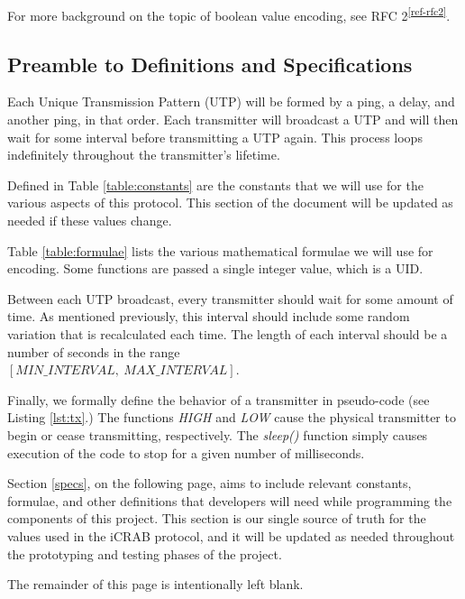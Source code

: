 \documentclass[12pt,hidelinks]{article}
\newcommand{\fastcite}[1]{\textsuperscript{\ref{#1}}}
\begin{document}
For more background on the topic of boolean value encoding, see
RFC 2\fastcite{ref-rfc2}.

\subsection{Preamble to Definitions and Specifications} \label{preamble}

Each Unique Transmission Pattern (UTP) will be formed by a ping, a delay,
and another ping, in that order.
Each transmitter will broadcast a UTP and will then wait for some interval
before transmitting a UTP again.
This process loops indefinitely throughout the transmitter's lifetime.

Defined in Table \ref{table:constants} are the constants that we will use for
the various aspects of this protocol.
This section of the document will be updated as needed if these values
change.

Table \ref{table:formulae} lists the various mathematical formulae we will
use for encoding.
Some functions are passed a single integer value, which is a UID.

Between each UTP broadcast, every transmitter should wait for some amount
of time.
As mentioned previously, this interval should include some random variation
that is recalculated each time.
The length of each interval should be a number of seconds in the range\\
$[MIN\_INTERVAL,\ MAX\_INTERVAL]$.

Finally, we formally define the behavior of a transmitter in pseudo-code
(see Listing \ref{lst:tx}.)
The functions {\em HIGH} and {\em LOW} cause the physical transmitter to begin
or cease transmitting, respectively.
The {\em sleep()} function simply causes execution of the code to stop for a
given number of milliseconds.

Section \ref{specs}, on the following page,
aims to include relevant constants, formulae, and other definitions
that developers will need while programming the components of this project.
This section is our single source of truth for the values used in the iCRAB
protocol, and it will be updated as needed throughout the prototyping and
testing phases of the project.

\vfill

\begin{center}
The remainder of this page is intentionally left blank.
\end{center}

\vfill
\end{document}
